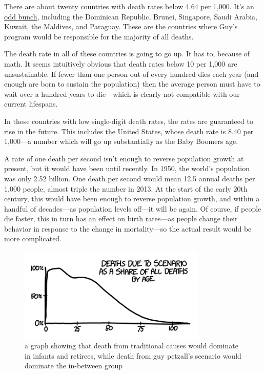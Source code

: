 {There are about twenty countries with death rates below 4.64 per 1,000. It’s an \href{https://www.cia.gov/library/publications/the-world-factbook/rankorder/2066rank.html}{odd bunch}, including the Dominican Republic, Brunei, Singapore, Saudi Arabia, Kuwait, the Maldives, and Paraguay. These are the countries where Guy’s program would be responsible for the majority of all deaths.}

{The death rate in all of these countries is going to go up. It has to, because of math. It seems intuitively obvious that death rates below 10 per 1,000 are unsustainable. If fewer than one person out of every hundred dies each year (and enough are born to sustain the population) then the average person must have to wait over a hundred years to die—which is clearly not compatible with our current lifespans.}

{In those countries with low single-digit death rates, the rates are guaranteed to rise in the future. This includes the United States, whose death rate is 8.40 per 1,000—a number which will go up substantially as the Baby Boomers age.}

{A rate of one death per second isn’t enough to reverse population growth at present, but it would have been until recently. In 1950, the world’s population was only 2.52 billion. One death per second would mean 12.5 annual deaths per 1,000 people, almost triple the number in 2013. At the start of the early 20th century, this would have been enough to reverse population growth, and within a handful of decades—as population levels off—it will be again. Of course, if people die faster, this in turn has an effect on birth rates—as people change their behavior in response to the change in mortality—so the actual result would be more complicated.}

\begin{figure}[!htbp]
\centering
\includegraphics[scale=0.5, max width=0.8\textwidth]{imgs/a/27/death_graph.png}
\caption{a graph showing that death from traditional causes would dominate in infants and retirees, while death from guy petzall's scenario would dominate the in-between group}
\end{figure}

